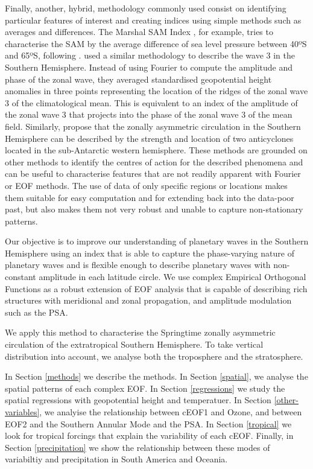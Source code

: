 \documentclass[smallextended]{svjour3}       %
\begin{document}
Finally, another, hybrid, methodology commonly used consist on identifying particular features of interest and creating indices using simple methods such as averages and differences.
The Marshal SAM Index \citep{marshall2003}, for example, tries to characterise the SAM by the average difference of sea level pressure between 40ºS and 65ºS, following \citet{gong1999}.
\citet{raphael2004} used a similar methodology to describe the wave 3 in the Southern Hemisphere.
Instead of using Fourier to compute the amplitude and phase of the zonal wave, they averaged standardised geopotential height anomalies in three points representing the location of the ridges of the zonal wave 3 of the climatological mean.
This is equivalent to an index of the amplitude of the zonal wave 3 that projects into the phase of the zonal wave 3 of the mean field.
Similarly, \citet{hobbs2010} propose that the zonally asymmetric circulation in the Southern Hemisphere can be described by the strength and location of two anticyclones located in the sub-Antarctic western hemisphere.
These methods are grounded on other methods to identify the centres of action for the described phenomena and can be useful to characterise features that are not readily apparent with Fourier or EOF methods.
The use of data of only specific regions or locations makes them suitable for easy computation and for extending back into the data-poor past, but also makes them not very robust and unable to capture non-stationary patterns.

Our objective is to improve our understanding of planetary waves in the Southern Hemisphere using an index that is able to capture the phase-varying nature of planetary waves and is flexible enough to describe planetary waves with non-constant amplitude in each latitude circle.
We use complex Empirical Orthogonal Functions \citep{horel1984} as a robust extension of EOF analysis that is capable of describing rich structures with meridional and zonal propagation, and amplitude modulation such as the PSA.

We apply this method to characterise the Springtime zonally asymmetric circulation of the extratropical Southern Hemisphere.
To take vertical distribution into account, we analyse both the troposphere and the stratosphere.

In Section \ref{methods} we describe the methods.
In Section \ref{spatial}, we analyse the spatial patterns of each complex EOF.
In Section \ref{regressions} we study the spatial regressions with geopotential height and temperatuer.
In Section \ref{other-variables}, we analyise the relationship between cEOF1 and Ozone, and between EOF2 and the Southern Annular Mode and the PSA.
In Section \ref{tropical} we look for tropical forcings that explain the variability of each cEOF.
Finally, in Section \ref{precipitation} we show the relationship between these modes of variabiltiy and precipitation in South America and Oceania.
\end{document}
